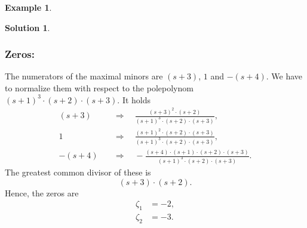 \documentclass[a4paper,12 pt]{article}
\numberwithin{equation}{section}
\theoremstyle{definition}
\newtheorem{bsp}{Example}
\theoremstyle{remark}
\theoremstyle{definition}
\newtheorem*{lsg}{Solution}
\theoremstyle{definition}
\theoremstyle{definition}
\theoremstyle{remark}
\begin{document}
\begin{bsp}
\begin{lsg}
\subsubsection*{Zeros:}
The numerators of the maximal minors are $(s+3)$, $1$ and $-(s+4)$. We have to normalize them with respect to the polepolynom $(s+1)^3\cdot(s+2)\cdot(s+3)$. It holds
\begin{align*}
(s+3)\quad &\Rightarrow\quad \frac{(s+3)^2\cdot(s+2)}{(s+1)^3\cdot(s+2)\cdot(s+3)},\\
1\quad &\Rightarrow \quad \frac{(s+1)^2\cdot(s+2)\cdot(s+3)}{(s+1)^3\cdot(s+2)\cdot(s+3)},\\
-(s+4)\quad &\Rightarrow\quad -\frac{(s+4)\cdot(s+1)\cdot(s+2)\cdot(s+3)}{(s+1)^3\cdot(s+2)\cdot(s+3)}.
\end{align*}
The greatest common divisor of these is
\begin{equation*}
(s+3)\cdot(s+2).
\end{equation*}
Hence, the zeros are
\begin{equation*}
\begin{split}
\zeta_1&=-2,\\
\zeta_2&=-3.
\end{split}
 \end{equation*}


\end{lsg}
\end{bsp}
\end{document}
